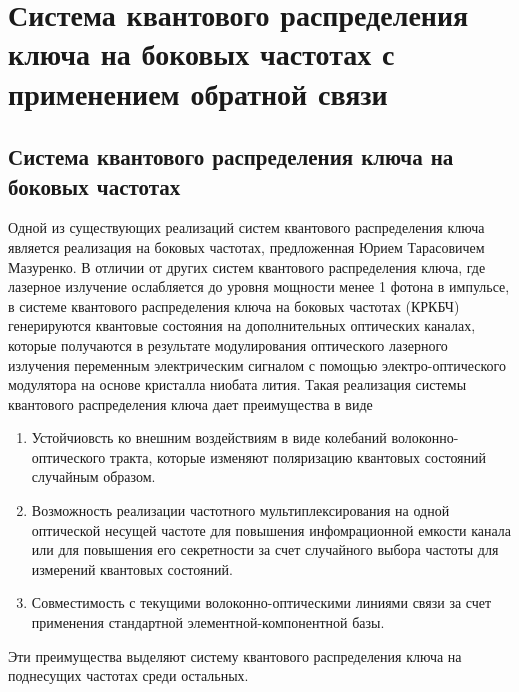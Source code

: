 \chapter{Система квантового распределения ключа на боковых частотах с применением обратной связи}\label{ch:ch2}
\section*{Система квантового распределения ключа на боковых частотах}
Одной из существующих реализаций систем квантового распределения ключа является реализация на боковых частотах, предложенная Юрием Тарасовичем Мазуренко. 
В отличии от других систем квантового распределения ключа, где лазерное излучение ослабляется до уровня мощности менее 1 фотона в импульсе, в системе квантового распределения ключа на боковых частотах (КРКБЧ) генерируются квантовые состояния на дополнительных оптических каналах, которые получаются в результате модулирования 
оптического лазерного излучения переменным электрическим сигналом с помощью электро-оптического модулятора на основе кристалла ниобата лития.
Такая реализация системы квантового распределения ключа дает преимущества в виде
\begin{enumerate}
    \item Устойчиовсть ко внешним воздействиям в виде колебаний волоконно-оптического тракта, которые изменяют поляризацию квантовых состояний случайным образом.
    \item Возможность реализации частотного мультиплексирования на одной оптической несущей частоте для повышения инфомрационной емкости канала или для повышения его секретности за счет случайного выбора частоты для измерений квантовых состояний.
    \item Совместимость с текущими волоконно-оптическими линиями связи за счет применения стандартной элементной-компонентной базы. 
\end{enumerate}
Эти преимущества выделяют систему квантового распределения ключа на поднесущих частотах среди остальных.
